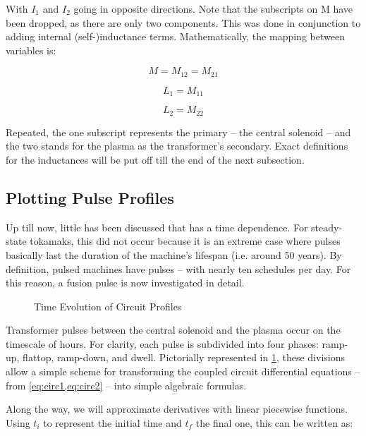 With $I_1$ and $I_2$ going in opposite directions. Note that the subscripts on M have been dropped, as there are only two components. This was done in conjunction to adding internal (self-)inductance terms. Mathematically, the mapping between variables is:

\begin{equation}
	M = M_{12} = M_{21}
\end{equation}

\begin{equation}
	L_1 = M_{11}\end{equation}

\begin{equation}
	L_2 = M_{22}
\end{equation}

Repeated, the one subscript represents the primary -- the central solenoid -- and the two stands for the plasma as the transformer's secondary. Exact definitions for the inductances will be put off till the end of the next subsection.

\subsection{Plotting Pulse Profiles}

Up till now, little has been discussed that has a time dependence. For steady-state tokamaks, this did not occur because it is an extreme case where pulses basically last the duration of the machine's lifespan (i.e. around 50 years). By definition, pulsed machines have pulses -- with nearly ten schedules per day. For this reason, a fusion pulse is now investigated in detail.

\begin{figure}[h!]
\centering

\caption{Time Evolution of Circuit Profiles}
\label{fig:circuit_profiles}
\end{figure}

Transformer pulses between the central solenoid and the plasma occur on the timescale of hours. For clarity, each pulse is subdivided into four phases: ramp-up, flattop, ramp-down, and dwell. Pictorially represented in \cref{fig:circuit_profiles}, these divisions allow a simple scheme for transforming the coupled circuit differential equations -- from \cref{eq:circ1,eq:circ2} -- into simple algebraic formulas. 

Along the way, we will approximate derivatives with linear piecewise functions. Using $t_i$ to represent the initial time and $t_f$ the final one, this can be written as:


